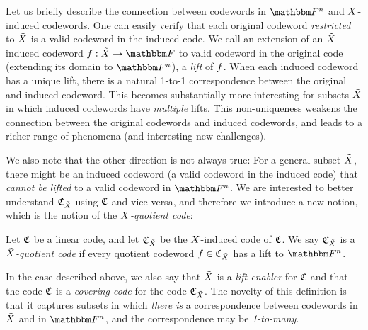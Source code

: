 Let us briefly describe the connection between codewords in $\field$ and ${\tilde{X}}$-induced codewords.
One can easily verify that each original codeword \emph{restricted} to ${\tilde{X}}$ is a valid codeword in the induced code.
\newline
We call an extension of an ${\tilde{X}}$-induced codeword $\funcdef{\onvarfunc}{\variety}{\basefield}$ to valid codeword in the original code (extending its domain to $\field$), a \emph{lift} of $\onvarfunc$.
When each induced codeword has a unique lift, there is a natural 1-to-1 correspondence between the original and induced codeword.
This becomes substantially more interesting for subsets ${\tilde{X}}$ in which induced codewords have \emph{multiple} lifts.
This non-uniqueness weakens the connection between the original codewords and induced codewords, and leads to a richer range of phenomena (and interesting new challenges).

We also note that the other direction is not always true: For a general subset ${\tilde{X}}$, there might be an induced codeword (a valid codeword in the induced code) that \emph{cannot be lifted} to a valid codeword in $\field$.
We are interested to better understand $\mathfrak{C}_{{\tilde{X}}}$ using $\mathfrak{C}$ and vice-versa, and therefore we introduce a new notion, which is the notion of the \emph{${\tilde{X}}$-quotient code}:
\begin{definition}
    Let $\mathfrak{C}$ be a linear code, and let $\mathfrak{C}_{{\tilde{X}}}$ be the ${\tilde{X}}$-induced code of $\mathfrak{C}$.
    We say $\mathfrak{C}_{{\tilde{X}}}$ is a \emph{${\tilde{X}}$-quotient code}
    if every quotient codeword $\onvarfunc \in \quotientcode$ has a lift to $\field$.
\end{definition}
In the case described above, we also say that ${\tilde{X}}$ is a \emph{lift-enabler} for $\mathfrak{C}$ and that the code $\mathfrak{C}$ is a \emph{covering code} for the code $\mathfrak{C}_{{\tilde{X}}}$.
\newline
The novelty of this definition is that it captures subsets in which \emph{there is} a correspondence between codewords in ${\tilde{X}}$ and in $\field$,
and the correspondence may be \emph{1-to-many}.


